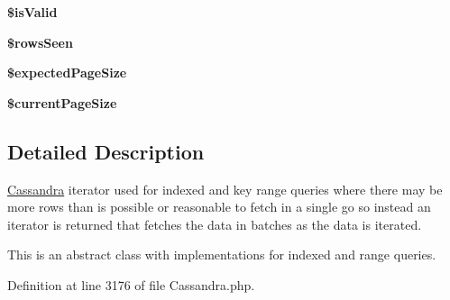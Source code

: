 \begin{DoxyCompactItemize}
\item 
\hypertarget{classCassandraDataIterator_a020ee424b711830688073ccc5f51ff3e}{
{\bfseries \$isValid}}
\label{classCassandraDataIterator_a020ee424b711830688073ccc5f51ff3e}

\item 
\hypertarget{classCassandraDataIterator_aecc13b3a764da2a649cc59e109ed9bc6}{
{\bfseries \$rowsSeen}}
\label{classCassandraDataIterator_aecc13b3a764da2a649cc59e109ed9bc6}

\item 
\hypertarget{classCassandraDataIterator_a97c85b648a8c0f552217a48c921c594d}{
{\bfseries \$expectedPageSize}}
\label{classCassandraDataIterator_a97c85b648a8c0f552217a48c921c594d}

\item 
\hypertarget{classCassandraDataIterator_aa7a065000d7e20c0eaecb5a403d5ed90}{
{\bfseries \$currentPageSize}}
\label{classCassandraDataIterator_aa7a065000d7e20c0eaecb5a403d5ed90}

\end{DoxyCompactItemize}


\subsection{Detailed Description}
\hyperlink{classCassandra}{Cassandra} iterator used for indexed and key range queries where there may be more rows than is possible or reasonable to fetch in a single go so instead an iterator is returned that fetches the data in batches as the data is iterated.

This is an abstract class with implementations for indexed and range queries. 

Definition at line 3176 of file Cassandra.php.



